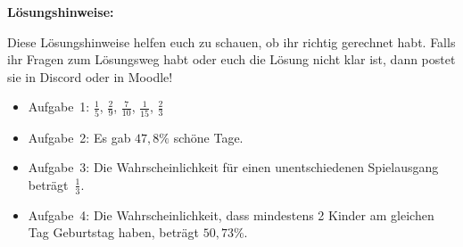 \documentclass{../cssheet}
\begin{document}
\newpage
\textbf{Lösungshinweise:} 

Diese Lösungshinweise helfen euch zu schauen, ob ihr richtig gerechnet habt. Falls ihr Fragen zum Lösungsweg habt oder euch die Lösung nicht klar ist, dann postet sie in Discord oder in Moodle!

\begin{itemize}
\item Aufgabe~1: $\frac{1}{5}$, $\frac{2}{9}$, $\frac{7}{10}$, $\frac{1}{15}$, $\frac{2}{3}$
\item Aufgabe~2: Es gab $47,8\%$ schöne Tage.
\item Aufgabe~3: Die Wahrscheinlichkeit für einen unentschiedenen Spielausgang beträgt~$\frac{1}{3}$.
\item Aufgabe~4: Die Wahrscheinlichkeit, dass mindestens 2 Kinder am gleichen Tag Geburtstag haben, beträgt $50,73\%$.
\end{itemize}

\vspace*{3cm}

\printlicense

\printsocials
\end{document}
